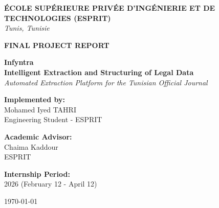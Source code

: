\documentclass[12pt,a4paper]{report}
\begin{document}
\begin{titlepage}
\centering
\vspace*{2cm}

{\Large \textbf{ÉCOLE SUPÉRIEURE PRIVÉE D'INGÉNIERIE ET DE TECHNOLOGIES (ESPRIT)}}\\
\vspace{0.5cm}
{\normalsize \textit{Tunis, Tunisie}}

\vspace{3cm}

{\Large \textbf{FINAL PROJECT REPORT}}

\vspace{2cm}

{\Huge \textbf{\color{darkblue}Infyntra}}\\
{\Large \textbf{Intelligent Extraction and Structuring of Legal Data}}\\
{\large \textit{Automated Extraction Platform for the Tunisian Official Journal}}

\vspace{3cm}

{\large \textbf{Implemented by:}}\\
\vspace{0.5cm}
Mohamed Iyed TAHRI\\
Engineering Student - ESPRIT

\vspace{2cm}

{\large \textbf{Academic Advisor:}}\\
Chaima Kaddour\\
ESPRIT

\vspace{2cm}

{\large \textbf{Internship Period:}}\\
2026 (February 12 - April 12)

\vspace{3cm}

\today

\end{titlepage}

\tableofcontents
\newpage

\end{document}
